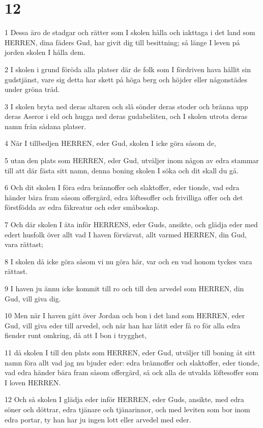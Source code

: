 \chapter{12}

\par 1 Dessa äro de stadgar och rätter som I skolen hålla och iakttaga i det land som HERREN, dina fäders Gud, har givit dig till besittning; så länge I leven på jorden skolen I hålla dem.
\par 2 I skolen i grund föröda alla platser där de folk som I fördriven hava hållit sin gudstjänst, vare sig detta har skett på höga berg och höjder eller någonstädes under gröna träd.
\par 3 I skolen bryta ned deras altaren och slå sönder deras stoder och bränna upp deras Aseror i eld och hugga ned deras gudabeläten, och I skolen utrota deras namn från sådana platser.
\par 4 När I tillbedjen HERREN, eder Gud, skolen I icke göra såsom de,
\par 5 utan den plats som HERREN, eder Gud, utväljer inom någon av edra stammar till att där fästa sitt namn, denna boning skolen I söka och dit skall du gå.
\par 6 Och dit skolen I föra edra brännoffer och slaktoffer, eder tionde, vad edra händer bära fram såsom offergärd, edra löftesoffer och frivilliga offer och det förstfödda av edra fäkreatur och eder småboskap.
\par 7 Och där skolen I äta inför HERRENS, eder Guds, ansikte, och glädja eder med edert husfolk över allt vad I haven förvärvat, allt varmed HERREN, din Gud, vara rättast;
\par 8 I skolen då icke göra såsom vi nu göra här, var och en vad honom tyckes vara rättast.
\par 9 I haven ju ännu icke kommit till ro och till den arvedel som HERREN, din Gud, vill giva dig.
\par 10 Men när I haven gått över Jordan och bon i det land som HERREN, eder Gud, vill giva eder till arvedel, och när han har låtit eder få ro för alla edra fiender runt omkring, då att I bon i trygghet,
\par 11 då skolen I till den plats som HERREN, eder Gud, utväljer till boning åt sitt namn föra allt vad jag nu bjuder eder: edra brännoffer och slaktoffer, eder tionde, vad edra händer bära fram såsom offergärd, så ock alla de utvalda löftesoffer som I loven HERREN.
\par 12 Och så skolen I glädja eder inför HERREN, eder Guds, ansikte, med edra söner och döttrar, edra tjänare och tjänarinnor, och med leviten som bor inom edra portar, ty han har ju ingen lott eller arvedel med eder.
